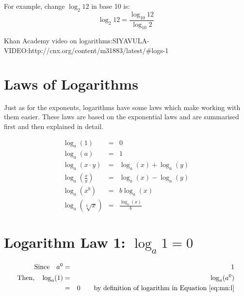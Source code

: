 For example, change $\log_{2}12$ in base 10 is:
\begin{equation*}
\log_{2}12=\frac{\log_{10}12}{\log_{10}2}
\end{equation*}

Khan Academy video on logarithms:SIYAVULA-VIDEO:http://cnx.org/content/m31883/latest/#logs-1
\section{Laws of Logarithms}
Just as for the exponents, logarithms have some laws which make working with them easier. These laws are based on the exponential laws and are summarised first and then explained in detail.

\begin{eqnarray}
\label{eq:mn:l:law1}
\log_{a}(1)&=&0\\
\label{eq:mn:l:law2}
\log_{a}(a)&=&1 \\
\label{eq:mn:l:law3}
\log_{a}(x\cdot y) &=& \log_{a}(x) + \log_{a}(y)\\
\label{eq:mn:l:law4}
\log_{a}\left(\frac{x}{y}\right) &=& \log_{a}(x) - \log_{a}(y) \\
\label{eq:mn:l:law5}
\log_{a}(x^b) &=& b \log_{a}(x)\\
\label{eq:mn:l:law6}
\log_{a}\left(\sqrt[b]{x}\right) &=& \frac{\log_{a}(x)}{b}
\end{eqnarray}

\section{Logarithm Law 1: $\log_{a}1 = 0$}
\begin{eqnarray*}
\mbox{Since}\quad a^0&=&1\\
\mbox{Then,}\quad \log_{a}(1) &=& \log_{a}(a^0)\\
&=&0\qquad \mbox{by definition of logarithm in Equation~\ref{eq:mn:l}}
\end{eqnarray*}

